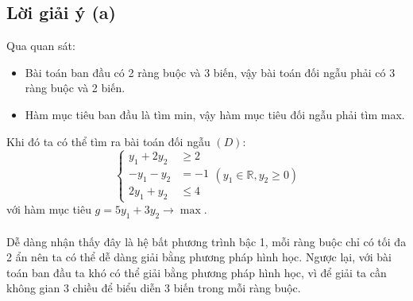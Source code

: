 \documentclass[12pt]{article}
\begin{document}
\subsection{Lời giải ý (a)}
Qua quan sát:
\begin{itemize}
    \item Bài toán ban đầu có 2 ràng buộc và 3 biến, vậy bài toán đối ngẫu phải có 3 ràng buộc và 2 biến.
    \item Hàm mục tiêu ban đầu là tìm min, vậy hàm mục tiêu đối ngẫu phải tìm max.
\end{itemize}
Khi đó ta có thể tìm ra bài toán đối ngẫu $(D)$:
\begin{equation}
\label{equation-5}
\left\{ 
\begin{aligned}
y_1 + 2y_2 &\geq 2 \\
-y_1 - y_2 &= -1 \\
2y_1 + y_2 &\leq 4
\end{aligned}
\right.
(y_1 \in \mathbb{R}, y_2 \geq 0)
\end{equation}
với hàm mục tiêu $g = 5y_1 + 3y_2 \rightarrow \max$.
\\\\
Dễ dàng nhận thấy đây là hệ bất phương trình bậc 1, mỗi ràng buộc chỉ có tối đa 2 ẩn nên ta có thể dễ dàng giải bằng phương pháp hình học. Ngược lại, với bài toán ban đầu ta khó có thể giải bằng phương pháp hình học, vì để giải ta cần không gian 3 chiều để biểu diễn 3 biến trong mỗi ràng buộc.
\end{document}
